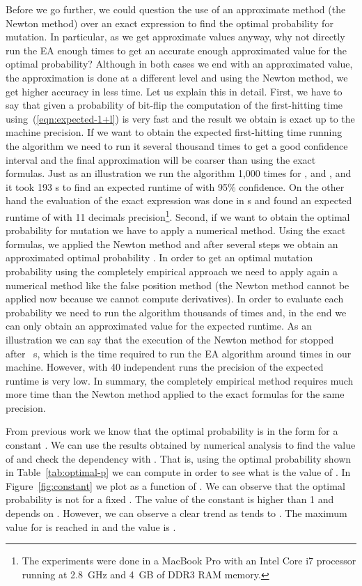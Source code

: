 \documentclass{article}
\begin{document}
Before we go further, we could question the use of an approximate method (the Newton method) over an exact expression to find the optimal probability for mutation. In particular, as we get approximate values anyway, why not directly run the  EA enough times to get an accurate enough approximated value for the optimal probability? Although in both cases we end with an approximated value, the approximation is done at a different level and using the Newton method, we get higher accuracy in less time. Let us explain this in detail. First, we have to say that given a probability of bit-flip  the computation of the first-hitting time using~(\ref{eqn:expected-1+l}) is very fast and the result we obtain is exact up to the machine precision. If we want to obtain the expected first-hitting time running the algorithm we need to run it several thousand times to get a good confidence interval and the final approximation will be coarser than using the exact formulas. Just as an illustration we run the algorithm 1,000 times for ,  and , and it took 193 s to find an expected runtime of  with 95\% confidence. On the other hand the evaluation of the exact expression was done in  s and found an expected runtime of  with 11 decimals precision\footnote{The experiments were done in a MacBook Pro with an Intel Core i7 processor running at 2.8~GHz and 4~GB of DDR3 RAM memory.}.
Second, if we want to obtain the optimal probability for mutation we have to apply a numerical method. Using the exact formulas, we applied the Newton method and after several steps we obtain an approximated optimal probability . In order to get an optimal mutation probability using the completely empirical approach we need to apply again a numerical method like the false position method (the Newton method cannot be applied now because we cannot compute derivatives). In order to evaluate each probability  we need to run the algorithm thousands of times and, in the end we can only obtain an approximated value for the expected runtime. As an illustration we can say that the execution of the Newton method for  stopped after ~s, which is the time required to run the  EA algorithm around  times in our machine. However, with 40 independent runs the precision of the expected runtime is very low. In summary, the completely empirical method requires much more time than the Newton method applied to the exact formulas for the same precision.


From previous work we know that the optimal probability is in the form  for a constant . We can use the results obtained by numerical analysis to find the value of  and check the dependency with . That is, using the optimal probability  shown in Table~\ref{tab:optimal-p} we can compute  in order to see what is the value of . In Figure~\ref{fig:constant} we plot  as a function of . We can observe that the optimal probability is not  for a fixed . The value of the constant  is higher than 1 and depends on . However, we can observe a clear trend  as  tends to . The maximum value for  is reached in  and the value is .
\end{document}
